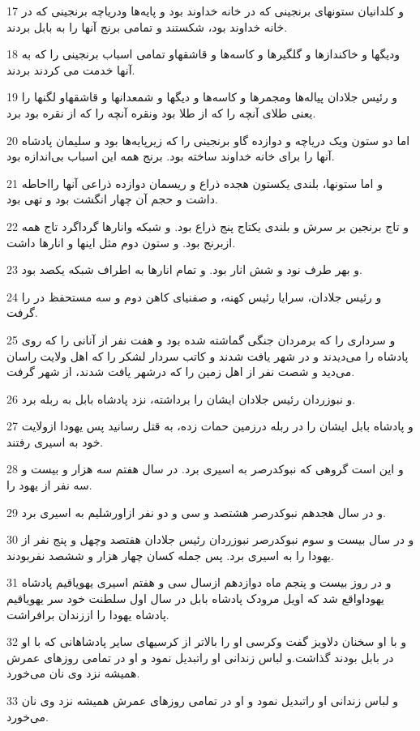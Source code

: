 \par 17 و کلدانیان ستونهای برنجینی که در خانه خداوند بود و پایه‌ها ودریاچه برنجینی که در خانه خداوند بود، شکستند و تمامی برنج آنها را به بابل بردند.
\par 18 ودیگها و خاکندازها و گلگیرها و کاسه‌ها و قاشقهاو تمامی اسباب برنجینی را که به آنها خدمت می کردند بردند.
\par 19 و رئیس جلادان پیاله‌ها ومجمرها و کاسه‌ها و دیگها و شمعدانها و قاشقهاو لگنها را یعنی طلای آنچه را که از طلا بود ونقره آنچه را که از نقره بود برد.
\par 20 اما دو ستون ویک دریاچه و دوازده گاو برنجینی را که زیرپایه‌ها بود و سلیمان پادشاه آنها را برای خانه خداوند ساخته بود. برنج همه این اسباب بی‌اندازه بود.
\par 21 و اما ستونها، بلندی یکستون هجده ذراع و ریسمان دوازده ذراعی آنها رااحاطه داشت و حجم آن چهار انگشت بود و تهی بود.
\par 22 و تاج برنجین بر سرش و بلندی یکتاج پنج ذراع بود. و شبکه وانارها گرداگرد تاج همه ازبرنج بود. و ستون دوم مثل اینها و انارها داشت.
\par 23 و بهر طرف نود و شش انار بود. و تمام انارها به اطراف شبکه یکصد بود.
\par 24 و رئیس جلادان، سرایا رئیس کهنه، و صفنیای کاهن دوم و سه مستحفظ در را گرفت.
\par 25 و سرداری را که برمردان جنگی گماشته شده بود و هفت نفر از آنانی را که روی پادشاه را می‌دیدند و در شهر یافت شدند و کاتب سردار لشکر را که اهل ولایت راسان می‌دید و شصت نفر از اهل زمین را که درشهر یافت شدند، از شهر گرفت.
\par 26 و نبوزردان رئیس جلادان ایشان را برداشته، نزد پادشاه بابل به ربله برد.
\par 27 و پادشاه بابل ایشان را در ربله درزمین حمات زده، به قتل رسانید پس یهودا ازولایت خود به اسیری رفتند.
\par 28 و این است گروهی که نبوکدرصر به اسیری برد. در سال هفتم سه هزار و بیست و سه نفر از یهود را.
\par 29 و در سال هجدهم نبوکدرصر هشتصد و سی و دو نفر ازاورشلیم به اسیری برد.
\par 30 و در سال بیست و سوم نبوکدرصر نبوزردان رئیس جلادان هفتصد وچهل و پنج نفر از یهودا را به اسیری برد. پس جمله کسان چهار هزار و ششصد نفربودند.
\par 31 و در روز بیست و پنجم ماه دوازدهم ازسال سی و هفتم اسیری یهویاقیم پادشاه یهوداواقع شد که اویل مرودک پادشاه بابل در سال اول سلطنت خود سر یهویاقیم پادشاه یهودا را اززندان برافراشت.
\par 32 و با او سخنان دلاویز گفت وکرسی او را بالاتر از کرسیهای سایر پادشاهانی که با او در بابل بودند گذاشت.و لباس زندانی او راتبدیل نمود و او در تمامی روزهای عمرش همیشه نزد وی نان می‌خورد.
\par 33 و لباس زندانی او راتبدیل نمود و او در تمامی روزهای عمرش همیشه نزد وی نان می‌خورد.


